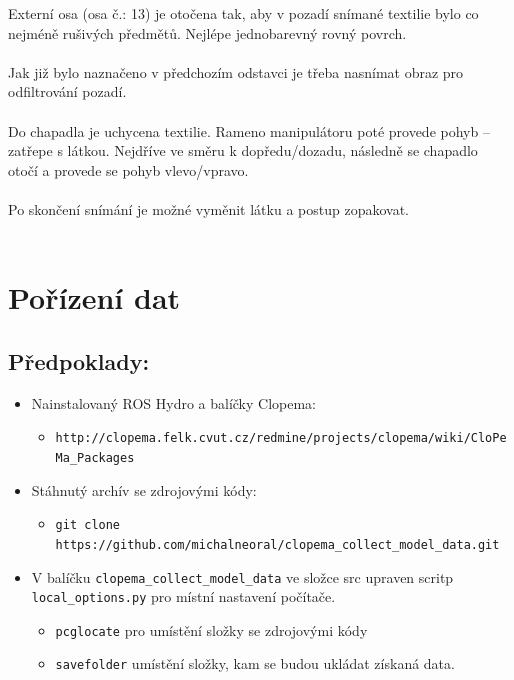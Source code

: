 \documentclass[10pt,a4paper,titlepage,oneside]{book}
\begin{document}
Externí osa (osa č.: 13) je otočena tak, aby v pozadí snímané textilie bylo co nejméně rušivých předmětů. Nejlépe jednobarevný rovný povrch.
\\
\\
Jak již bylo naznačeno v předchozím odstavci je třeba nasnímat obraz pro odfiltrování pozadí.\\
\\
Do chapadla je uchycena textilie. Rameno manipulátoru poté provede pohyb – zatřepe s látkou. Nejdříve ve směru k dopředu/dozadu, následně se chapadlo otočí a provede se pohyb vlevo/vpravo.\\
\\
Po skončení snímání je možné vyměnit látku a postup zopakovat.\\
\\

\section*{Pořízení dat}
\subsection*{Předpoklady:}

\begin{itemize}
  \item Nainstalovaný ROS Hydro a balíčky Clopema:
  \begin{itemize} 
  
  	\item \verb|http://clopema.felk.cvut.cz/redmine/projects/clopema/wiki/CloPeMa_Packages|
  \end{itemize}
  
  \item Stáhnutý archív se zdrojovými kódy:
  \begin{itemize}
  	\item \verb|git clone https://github.com/michalneoral/clopema_collect_model_data.git|
  \end{itemize}
  
  \item V balíčku \verb|clopema_collect_model_data| ve složce src upraven scritp \verb|local_options.py| pro místní nastavení počítače.
  \begin{itemize}
  	\item \verb|pcglocate| pro umístění složky se zdrojovými kódy
  	\item \verb|savefolder| umístění složky, kam se budou ukládat získaná data.
  \end{itemize}  
\end{itemize}
\end{document}
